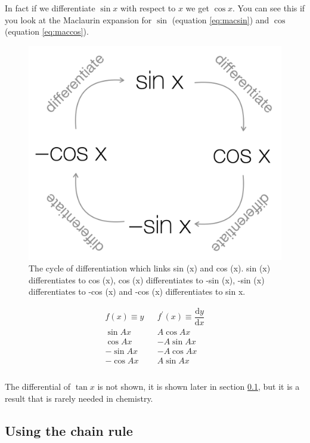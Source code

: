 \documentclass[
]{book}
\begin{document}
In fact if we differentiate \(\sin x\) with respect to \(x\) we get \(\cos x\). You can see this if you look at the Maclaurin expansion for \(\sin\) (equation \eqref{eq:macsin}) and \(\cos\) (equation \eqref{eq:maccos}).

\begin{figure}

{\centering \includegraphics[width=0.6\linewidth]{images/difftrigcycle} 

}

\caption{The cycle of differentiation which links sin (x) and cos (x). sin (x) differentiates to cos (x), cos (x) differentiates to -sin (x), -sin (x) differentiates to -cos (x) and -cos (x) differentiates to sin x.}\label{fig:difftrig}
\end{figure}

\begin{equation}
\begin{array}{ccc}
  f(x) \equiv y & & f^{\prime}(x) \equiv \dfrac{\textrm{d}y}{\textrm{d}x}\\
  \hline
\sin Ax & &A\cos Ax \\
\cos Ax & &-A\sin Ax \\
-\sin Ax & &-A\cos Ax \\
-\cos Ax & &A\sin Ax \\
\\
\end{array}
\end{equation}

The differential of \(\tan x\) is not shown, it is shown later in section \ref{subsec:chainrule}, but it is a result that is rarely needed in chemistry.

\hypertarget{subsec:chainrule}{%
\subsection{Using the chain rule}\label{subsec:chainrule}}
\end{document}
